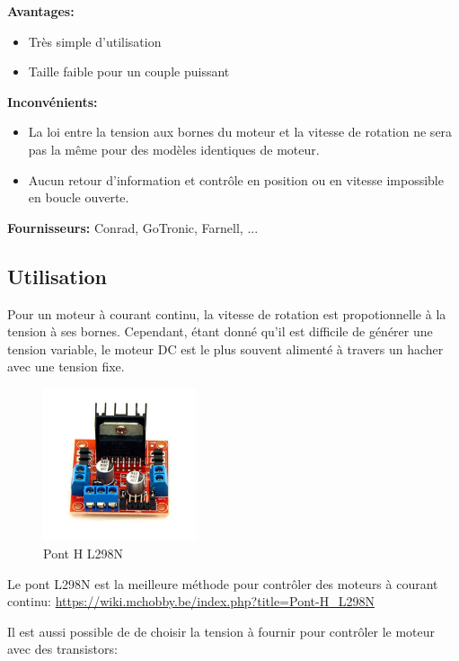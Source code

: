 \documentclass[a4paper, 11pt]{report}
\begin{document}
\textbf{Avantages:}
\begin{itemize}
\item Très simple d'utilisation
\item Taille faible pour un couple puissant
\end{itemize}

\textbf{Inconvénients:}
\begin{itemize}
\item La loi entre la tension aux bornes du moteur et la vitesse de rotation ne sera pas la même pour des modèles identiques de moteur.
\item Aucun retour d'information et contrôle en position ou en vitesse impossible en boucle ouverte.
\end{itemize}

\textbf{Fournisseurs:} Conrad, GoTronic, Farnell, ...


\subsection{Utilisation}
Pour un moteur à courant continu, la vitesse de rotation est propotionnelle à la tension à ses bornes. Cependant, étant donné qu'il est difficile de générer une tension variable, le moteur DC est le plus souvent alimenté à travers un hacher avec une tension fixe.

\begin{figure}[h!]
\begin{centering}
\includegraphics[width=0.4\textwidth]{images/L298N.jpg}
\caption{Pont H L298N}
\par\end{centering}
\end{figure}

Le pont L298N est la meilleure méthode pour contrôler des moteurs à courant continu: \url{https://wiki.mchobby.be/index.php?title=Pont-H_L298N}


Il est aussi possible de de choisir la tension à fournir pour contrôler le moteur avec des transistors:
\end{document}
